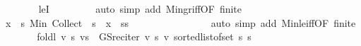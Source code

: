 \begin{isabellebody}
\ \ \ \ \ \ \isamarkupfalse%
\ leI\ {}\isanewline
\ \ \ \ \ \ \isamarkupfalse%
\ {\isacharparenleft}{\kern0pt}auto\ simp\ add{\isacharcolon}{\kern0pt}\ Min{\isacharunderscore}{\kern0pt}gr{\isacharunderscore}{\kern0pt}iff{\isacharbrackleft}{\kern0pt}OF\ finite{\isacharbrackright}{\kern0pt}{\isacharparenright}{\kern0pt}\isanewline
\ \ \ \ \isamarkupfalse%
\ \isamarkupfalse%
\ {\isachardoublequoteopen}{\isacharbraceleft}{\kern0pt}x\ {\isasymin}\ {\isacharbraceleft}{\kern0pt}{\isachardot}{\kern0pt}{\isachardot}{\kern0pt}{\isacharless}{\kern0pt}s{\isacharbraceright}{\kern0pt}{\isachardot}{\kern0pt}\ Min\ {\isacharparenleft}{\kern0pt}Collect\ {\isacharparenleft}{\kern0pt}{\isacharparenleft}{\kern0pt}{\isacharless}{\kern0pt}{\isacharparenright}{\kern0pt}\ s{\isacharprime}{\kern0pt}{\isacharparenright}{\kern0pt}{\isacharparenright}{\kern0pt}\ {\isasymle}\ x{\isacharbraceright}{\kern0pt}\ {\isacharequal}{\kern0pt}\ {\isacharbraceleft}{\kern0pt}s{\isacharprime}{\kern0pt}{\isacharless}{\kern0pt}{\isachardot}{\kern0pt}{\isachardot}{\kern0pt}{\isacharless}{\kern0pt}s{\isacharbraceright}{\kern0pt}{\isachardoublequoteclose}\isanewline
\ \ \ \ \ \ \isamarkupfalse%
\ {\isacharasterisk}{\kern0pt}\isanewline
\ \ \ \ \ \ \isamarkupfalse%
\ {\isacharparenleft}{\kern0pt}auto\ simp\ add{\isacharcolon}{\kern0pt}\ Min{\isacharunderscore}{\kern0pt}le{\isacharunderscore}{\kern0pt}iff{\isacharbrackleft}{\kern0pt}OF\ finite{\isacharbrackright}{\kern0pt}{\isacharparenright}{\kern0pt}\isanewline
\ \ \ \ \isamarkupfalse%
\ \isamarkupfalse%
\ {\isachardoublequoteopen}foldl\ {\isacharparenleft}{\kern0pt}{\isasymlambda}v\ s{\isachardot}{\kern0pt}\ v{\isacharparenleft}{\kern0pt}s\ {\isacharcolon}{\kern0pt}{\isacharequal}{\kern0pt}\ GS{\isacharunderscore}{\kern0pt}rec{\isacharunderscore}{\kern0pt}iter\ v\ s{\isacharparenright}{\kern0pt}{\isacharparenright}{\kern0pt}\ v\ {\isacharparenleft}{\kern0pt}sorted{\isacharunderscore}{\kern0pt}list{\isacharunderscore}{\kern0pt}of{\isacharunderscore}{\kern0pt}set\ {\isacharbraceleft}{\kern0pt}{\isachardot}{\kern0pt}{\isachardot}{\kern0pt}{\isacharless}{\kern0pt}s{\isacharbraceright}{\kern0pt}{\isacharparenright}{\kern0pt}\ s{\isacharprime}{\kern0pt}\ \isanewline

\end{isabellebody}
